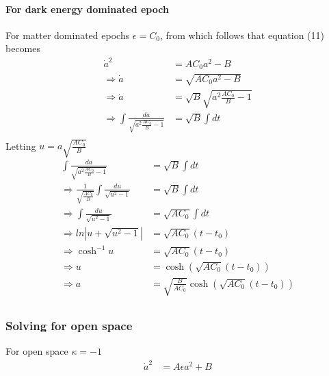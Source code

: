 \documentclass[a4paper, 11pt]{FSKH_623_Report}
\numberwithin{equation}{section}
\newcommand{\brac}[1]{\left(#1\right)}
\begin{document}
\paragraph*{For dark energy dominated epoch}
For matter dominated epochs $\epsilon=C_{0}$, from which follows that equation (11) becomes
\begin{equation}
\begin{split}
\dot{a}^{2} &= AC_{0}a^{2}-B\\
\Rightarrow \dot{a} &= \sqrt{AC_{0}a^{2}-B}\\
\Rightarrow \dot{a} &= \sqrt{B}\sqrt{a^{2}\frac{AC_{0}}{B}-1}\\
\Rightarrow \int \frac{da}{\sqrt{a^{2}\frac{AC_{0}}{B}-1}} &= \sqrt{B}\int dt\\
\end{split}
\end{equation}
Letting $u=a\sqrt{\frac{AC_{0}}{B}}$
\begin{equation}
\begin{split}
\int \frac{da}{\sqrt{a^{2}\frac{AC_{0}}{B}-1}} &= \sqrt{B}\int dt\\
\Rightarrow \frac{1}{\sqrt{\frac{AC_{0}}{B}}}\int\frac{du}{\sqrt{u^{2}-1}} &= \sqrt{B}\int dt\\
\Rightarrow \int\frac{du}{\sqrt{u^{2}-1}} &= \sqrt{AC_{0}}\int dt\\
\Rightarrow ln\left|u+\sqrt{u^{2}-1}\right| &= \sqrt{AC_{0}}\brac{t-t_{0}}\\
\Rightarrow \cosh^{-1} u &= \sqrt{AC_{0}}\brac{t-t_{0}}\\
\Rightarrow u &= \cosh\brac{\sqrt{AC_{0}}\brac{t-t_{0}}}\\
\Rightarrow a &= \sqrt{\frac{B}{AC_{0}}}\cosh\brac{\sqrt{AC_{0}}\brac{t-t_{0}}}\\
\end{split}
\end{equation}
\subsubsection*{Solving for open space}
For open space $\kappa=-1$
\begin{equation}
\begin{split}
\dot{a}^{2} &= A\epsilon a^{2}+B\\
\end{split}
\end{equation}
\end{document}
